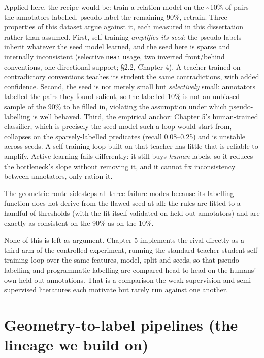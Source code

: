 Applied here, the recipe would be: train a relation model on the \textasciitilde{}10\% of pairs the annotators labelled, pseudo-label the remaining 90\%, retrain. Three properties of this dataset argue against it, each measured in this dissertation rather than assumed. First, self-training \textit{amplifies its seed}: the pseudo-labels inherit whatever the seed model learned, and the seed here is sparse and internally inconsistent (selective \texttt{near} usage, two inverted front/behind conventions, one-directional support; \S2.2, Chapter 4). A teacher trained on contradictory conventions teaches its student the same contradictions, with added confidence. Second, the seed is not merely small but \textit{selectively} small: annotators labelled the pairs they found salient, so the labelled 10\% is not an unbiased sample of the 90\% to be filled in, violating the assumption under which pseudo-labelling is well behaved. Third, the empirical anchor: Chapter 5's human-trained classifier, which is precisely the seed model such a loop would start from, collapses on the sparsely-labelled predicates (recall 0.08--0.25) and is unstable across seeds. A self-training loop built on that teacher has little that is reliable to amplify. Active learning fails differently: it still buys \textit{human} labels, so it reduces the bottleneck's slope without removing it, and it cannot fix inconsistency between annotators, only ration it.

The geometric route sidesteps all three failure modes because its labelling function does not derive from the flawed seed at all: the rules are fitted to a handful of thresholds (with the fit itself validated on held-out annotators) and are exactly as consistent on the 90\% as on the 10\%.

None of this is left as argument. Chapter 5 implements the rival directly as a third arm of the controlled experiment, running the standard teacher-student self-training loop over the same features, model, split and seeds, so that pseudo-labelling and programmatic labelling are compared head to head on the humans' own held-out annotations. That is a comparison the weak-supervision and semi-supervised literatures each motivate but rarely run against one another.

\section{Geometry-to-label pipelines (the lineage we build on)}


